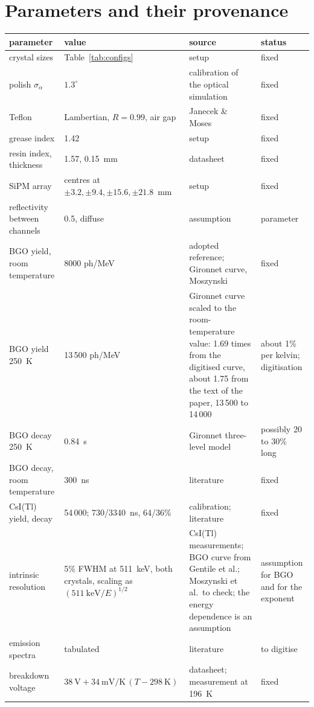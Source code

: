 \documentclass[11pt]{article}
\newcommand{\us}{\textmu s\xspace}
\newcommand{\csitl}{CsI(Tl)\xspace}
\begin{document}
\section{Parameters and their provenance}
\label{sec:parameters}

\begin{table}[htb]
\centering
\small
\begin{tabular}{p{} p{} p{} p{}}
\toprule
parameter & value & source & status \\
\midrule
crystal sizes & Table~\ref{tab:configs} & setup & fixed \\
polish $\sigma_\alpha$ & $1.3^\circ$ & calibration of the optical simulation & fixed \\
Teflon & Lambertian, $R = 0.99$, air gap & Janecek \& Moses & fixed \\
grease index & 1.42 & setup & fixed \\
resin index, thickness & 1.57, 0.15~mm & datasheet & fixed \\
SiPM array & centres at $\pm3.2, \pm9.4, \pm15.6, \pm21.8$~mm & setup & fixed \\
reflectivity between channels & 0.5, diffuse & assumption & parameter \\
BGO yield, room temperature & 8000 ph/MeV & adopted reference; Gironnet curve, Moszynski & fixed \\
BGO yield 250~K & 13\,500 ph/MeV & Gironnet curve scaled to the room-temperature value: 1.69 times from the digitised curve, about 1.75 from the text of the paper, 13\,500 to 14\,000 & about 1\% per kelvin; digitisation \\
BGO decay 250~K & 0.84~\us & Gironnet three-level model & possibly 20 to 30\% long \\
BGO decay, room temperature & 300~ns & literature & fixed \\
\csitl yield, decay & 54\,000; 730/3340~ns, 64/36\% & calibration; literature & fixed \\
intrinsic resolution & 5\% FWHM at 511~keV, both crystals, scaling as $(511~\mathrm{keV}/E)^{1/2}$ & \csitl measurements; BGO curve from Gentile et al.; Moszynski et al.\ to check; the energy dependence is an assumption & assumption for BGO and for the exponent \\
emission spectra & tabulated & literature & to digitise \\
breakdown voltage & $38~\mathrm{V} + 34~\mathrm{mV/K}\,(T-298~\mathrm{K})$ & datasheet; measurement at 196~K & fixed \\

\end{tabular}
\end{table}
\end{document}
